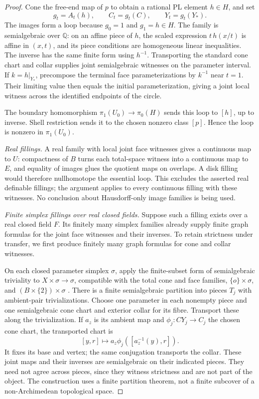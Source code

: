 \begin{proof}
Cone the free-end map of $p$ to obtain a rational PL element
$h\in H$, and set
\[
 g_t=A_t(h),\qquad C_t=g_t(C),\qquad Y_t=g_t(Y_*).
\]
The images form a loop because $g_0=1$ and $g_1=h\in H$.
The family is semialgebraic over $\mathbb Q$: on an affine piece
of $h$, the scaled expression $t\,h(x/t)$ is affine in $(x,t)$,
and its piece conditions are homogeneous linear inequalities.
The inverse has the same finite form using $h^{-1}$.
Transporting the standard cone chart and collar supplies joint
semialgebraic witnesses on the parameter interval.
If $k=h|_{Y_*}$, precompose the terminal face parameterizations
by $k^{-1}$ near $t=1$.  Their limiting value then equals the
initial parameterization, giving a joint local witness across
the identified endpoints of the circle.

The boundary homomorphism
$\pi_1(U_0)\to\pi_0(H)$ sends this loop to $[h]$, up to inverse.
Shell restriction sends it to the chosen nonzero class $[p]$.
Hence the loop is nonzero in $\pi_1(U_0)$.

\emph{Real fillings.}
A real family with local joint face witnesses gives a continuous
map to $U$: compactness of $B$ turns each total-space witness into
a continuous map to $E$, and equality of images glues the quotient
maps on overlaps.  A disk filling would therefore nullhomotope the
essential loop.  This excludes the asserted real definable fillings;
the argument applies to every continuous filling with these
witnesses.  No conclusion about Hausdorff-only image families is
being used.

\emph{Finite simplex fillings over real closed fields.}
Suppose such a filling exists over a real closed field $F$.
Its finitely many simplex families already supply finite graph
formulas for the joint face witnesses and their inverses.
To retain strictness under transfer, we first produce finitely
many graph formulas for cone and collar witnesses.

On each closed parameter simplex $\sigma$, apply the finite-subset
form of semialgebraic triviality to $X\times\sigma\to\sigma$,
compatible with the total cone and face families,
$\{o\}\times\sigma$, and $(B\times\{2\})\times\sigma$
\cite{Hardt1980}\cite[Theorem~5.46]{BasuPollackRoy2006}.
There is a finite semialgebraic partition into pieces $T_j$ with
ambient-pair trivializations.  Choose one parameter in each
nonempty piece and one semialgebraic cone chart and exterior
collar for its fibre.  Transport these along the trivialization.
If $a_z$ is its ambient map and $\phi_j:CY_j\to C_j$ the chosen
cone chart, the transported chart is
\[
 [y,r]\longmapsto a_z\phi_j([a_z^{-1}(y),r]).
\]
It fixes its base and vertex; the same conjugation transports
the collar.  These joint maps and their inverses are semialgebraic
on their indicated pieces.  They need not agree across pieces,
since they witness strictness and are not part of the object.
The construction uses a finite partition theorem, not a finite
subcover of a non-Archimedean topological space.


\end{proof}
